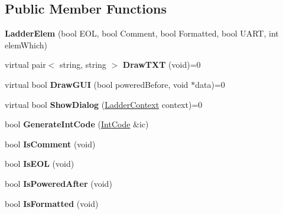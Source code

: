 \subsection*{Public Member Functions}
\begin{DoxyCompactItemize}
\item 
\hypertarget{class_ladder_elem_a502ddd7d70be71002b99313d7e1dcdd5}{{\bfseries Ladder\-Elem} (bool E\-O\-L, bool Comment, bool Formatted, bool U\-A\-R\-T, int elem\-Which)}\label{class_ladder_elem_a502ddd7d70be71002b99313d7e1dcdd5}

\item 
\hypertarget{class_ladder_elem_a781692db86abe1d586e8837945b2ed38}{virtual pair$<$ string, string $>$ {\bfseries Draw\-T\-X\-T} (void)=0}\label{class_ladder_elem_a781692db86abe1d586e8837945b2ed38}

\item 
\hypertarget{class_ladder_elem_ac6a95244d693eb119fe26a46bfffc29f}{virtual bool {\bfseries Draw\-G\-U\-I} (bool powered\-Before, void $\ast$data)=0}\label{class_ladder_elem_ac6a95244d693eb119fe26a46bfffc29f}

\item 
\hypertarget{class_ladder_elem_a81500d77c2a73411bf4ffb317d385005}{virtual bool {\bfseries Show\-Dialog} (\hyperlink{struct_ladder_context}{Ladder\-Context} context)=0}\label{class_ladder_elem_a81500d77c2a73411bf4ffb317d385005}

\item 
\hypertarget{class_ladder_elem_a0de8dcca285f79a92d1d986b73b91a8a}{bool {\bfseries Generate\-Int\-Code} (\hyperlink{class_int_code}{Int\-Code} \&ic)}\label{class_ladder_elem_a0de8dcca285f79a92d1d986b73b91a8a}

\item 
\hypertarget{class_ladder_elem_a181e249958bc9db083d332f9c0a743bf}{bool {\bfseries Is\-Comment} (void)}\label{class_ladder_elem_a181e249958bc9db083d332f9c0a743bf}

\item 
\hypertarget{class_ladder_elem_a85fc6642a02d3e1d21e38b137d0e28b9}{bool {\bfseries Is\-E\-O\-L} (void)}\label{class_ladder_elem_a85fc6642a02d3e1d21e38b137d0e28b9}

\item 
\hypertarget{class_ladder_elem_a684c0eb890c674a55783bc94315c5775}{bool {\bfseries Is\-Powered\-After} (void)}\label{class_ladder_elem_a684c0eb890c674a55783bc94315c5775}

\item 
\hypertarget{class_ladder_elem_a574a88ffbd2b9d09947d3d117347ece8}{bool {\bfseries Is\-Formatted} (void)}\label{class_ladder_elem_a574a88ffbd2b9d09947d3d117347ece8}


\end{DoxyCompactItemize}
